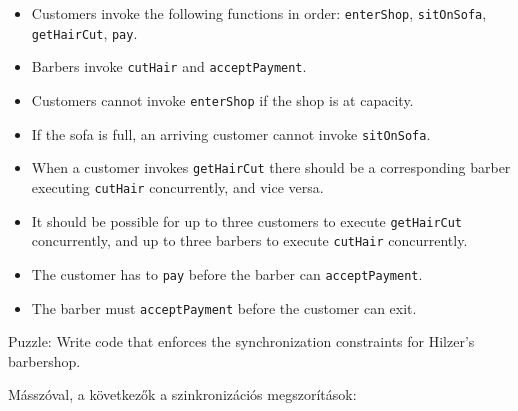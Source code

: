 \documentclass{book}
\begin{document}
\begin{itemize}

\item Customers invoke the following functions in order:
{\tt enterShop}, {\tt sitOnSofa},
{\tt getHairCut}, {\tt pay}.

\item Barbers invoke {\tt cutHair} and {\tt acceptPayment}.

\item Customers cannot invoke {\tt enterShop} if the shop
is at capacity.

\item If the sofa is full, an arriving customer cannot invoke 
{\tt sitOnSofa}.

\item When a customer invokes {\tt getHairCut} there should be
a corresponding barber executing {\tt cutHair} concurrently,
and vice versa.

\item It should be possible for up to three customers to execute
{\tt getHairCut} concurrently, and up to three barbers to execute
{\tt cutHair} concurrently.

\item The customer has to {\tt pay} before the barber can
{\tt acceptPayment}.

\item The barber must {\tt acceptPayment} before the customer can
exit.

\end{itemize}

Puzzle: Write code that enforces the synchronization
constraints for Hilzer's barbershop.

Másszóval, a következők a szinkronizációs megszorítások:
\end{document}

